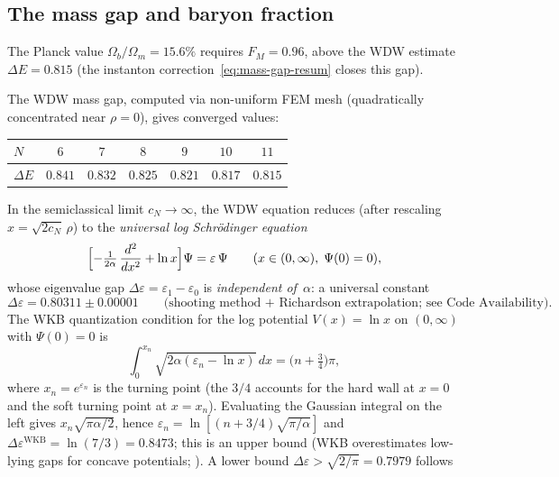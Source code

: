\subsection{The mass gap and baryon fraction}
\label{sec:mass-gap}

The Planck value $\Omega_b/\Omega_m = 15.6\%$ requires
$F_M = 0.96$, above the WDW estimate $\Delta E = 0.815$
(the instanton correction~\eqref{eq:mass-gap-resum} closes
this gap).

The WDW mass gap, computed via non-uniform FEM mesh
(quadratically concentrated near $\rho = 0$), gives converged values:
\begin{center}
\small
\begin{tabular}{lcccccc}
\toprule
$N$ & $6$ & $7$ & $8$ & $9$ & $10$ & $11$ \\
\midrule
$\Delta E$ & $0.841$ & $0.832$ & $0.825$ & $0.821$ & $0.817$ & $0.815$ \\
\bottomrule
\end{tabular}
\end{center}
\noindent
In the semiclassical limit $c_N \to \infty$, the WDW equation
reduces (after rescaling $x = \sqrt{2c_N}\,\rho$) to the
\emph{universal log Schr\"odinger equation}
\begin{equation}\label{eq:log-schrodinger}
  \Bigl[-\tfrac{1}{2\alpha}\,\frac{d^2}{dx^2} + \ln x\Bigr]\Psi
  = \varepsilon\,\Psi
  \qquad (x \in (0,\infty),\; \Psi(0) = 0),
\end{equation}
whose eigenvalue gap
$\Delta\varepsilon = \varepsilon_1 - \varepsilon_0$
is \emph{independent of~$\alpha$}: a universal constant
\begin{equation}\label{eq:mass-gap}
  \Delta\varepsilon = 0.80311 \pm 0.00001
  \qquad\text{(shooting method + Richardson extrapolation;
  see Code Availability)}.
\end{equation}
The WKB quantization condition for the log potential
$V(x) = \ln x$ on $(0,\infty)$ with $\Psi(0) = 0$ is
\[
  \int_0^{x_n}\!\sqrt{2\alpha(\varepsilon_n - \ln x)}\,dx
  = \bigl(n + \tfrac{3}{4}\bigr)\pi,
\]
where $x_n = e^{\varepsilon_n}$ is the turning point
(the $3/4$ accounts for the hard wall at $x = 0$
and the soft turning point at $x = x_n$).
Evaluating the Gaussian integral on the left gives
$x_n\sqrt{\pi\alpha/2}$, hence
$\varepsilon_n = \ln[(n{+}3/4)\sqrt{\pi/\alpha}]$
and $\Delta\varepsilon^{\mathrm{WKB}}
= \ln(7/3) = 0.8473$;
this is an upper bound (WKB overestimates low-lying gaps
for concave potentials; \citealt{Langer1937}).
A lower bound $\Delta\varepsilon > \sqrt{2/\pi} = 0.7979$ follows
